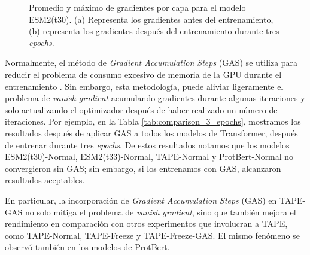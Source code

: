 \begin{figure}[h]
	\centering
	
	
	\caption[Gradientes del modelo ESM2(t30)]{Promedio y máximo de gradientes por capa para el modelo ESM2(t30). (a) Representa los gradientes antes del entrenamiento, (b) representa los gradientes después del entrenamiento durante tres \textit{epochs}.}
	\label{fig:t30}
\end{figure}


Normalmente, el método de \textit{Gradient Accumulation Steps} (GAS) se utiliza  para reducir el problema de consumo excesivo de memoria de la GPU durante el entrenamiento \citep{zhang2023adam,huang2023measuring}. Sin embargo, esta metodología, puede aliviar ligeramente el problema de \textit{vanish gradient} acumulando gradientes durante algunas iteraciones y solo actualizando el optimizador después de haber realizado un número de iteraciones. Por ejemplo, en la Tabla \ref{tab:comparison_3_epochs}, mostramos los resultados después de aplicar GAS a todos los modelos de Transformer, después de entrenar durante tres \textit{epochs}. De estos resultados notamos que los modelos ESM2(t30)-Normal, ESM2(t33)-Normal, TAPE-Normal y ProtBert-Normal no convergieron sin GAS; sin embargo, si los entrenamos con GAS, alcanzaron resultados aceptables.

En particular, la incorporación de\textit{ Gradient Accumulation Steps} (GAS) en TAPE-GAS no solo mitiga el problema de \textit{vanish gradient}, sino que también mejora el rendimiento en comparación con otros experimentos que involucran a TAPE, como TAPE-Normal, TAPE-Freeze y TAPE-Freeze-GAS. El mismo fenómeno se observó también en los modelos de ProtBert.


